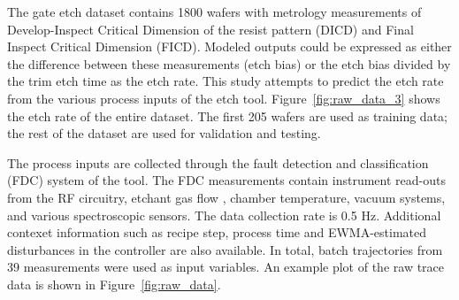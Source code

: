 The gate etch dataset contains 1800 wafers with metrology measurements of Develop-Inspect Critical Dimension of the resist pattern (DICD) and Final Inspect Critical Dimension
(FICD). Modeled outputs could be expressed as either the difference between
these measurements (etch bias) or the etch bias divided by the trim etch time
as the etch rate. This study attempts to predict the etch rate from the various process inputs of the etch tool. Figure~\ref{fig:raw_data_3} shows the etch rate of the entire dataset.
The first 205 wafers are used as training data; the rest of the dataset
are used for validation and testing.

The process inputs are collected through the fault detection and classification (FDC) system of the tool. 
The FDC measurements contain instrument read-outs from the RF circuitry, etchant gas flow
, chamber temperature, vacuum systems, and various spectroscopic sensors. The data collection rate is 0.5 Hz. Additional contexet information such as recipe step, process
time and EWMA-estimated disturbances in the controller are also available. In total, batch trajectories from 39 measurements were used as input
variables. An example plot of the raw trace data is shown in Figure~\ref{fig:raw_data}.


